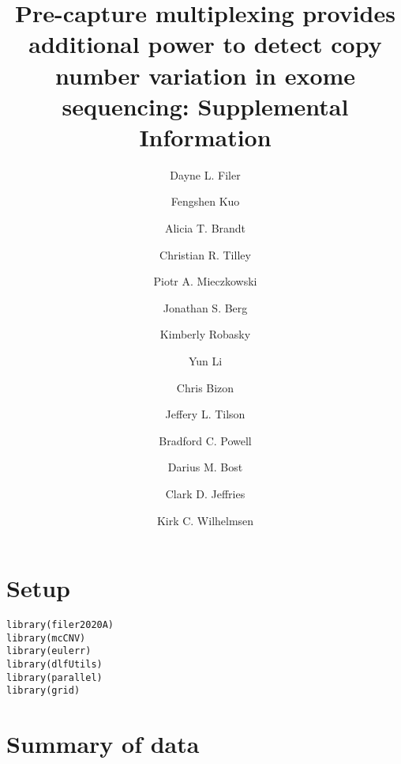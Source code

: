 \documentclass{article}\usepackage[]{graphicx}\usepackage[]{color}
\makeatletter
\newcommand{\hlstd}[1]{\textcolor[rgb]{0.196,0.196,0.196}{#1}}%
\newcommand{\hlkwd}[1]{\textcolor[rgb]{0.78,0.227,0.412}{#1}}%
\newenvironment{kframe}{%
 \def\at@end@of@kframe{}%
 \ifinner\ifhmode%
  \def\at@end@of@kframe{\end{minipage}}%
  \begin{minipage}{\columnwidth}%
 \fi\fi%
 \def\FrameCommand##1{\hskip\@totalleftmargin \hskip-\fboxsep
 \colorbox{shadecolor}{##1}\hskip-\fboxsep
     \hskip-\linewidth \hskip-\@totalleftmargin \hskip\columnwidth}%
 \MakeFramed {\advance\hsize-\width
   \@totalleftmargin\z@ \linewidth\hsize
   \@setminipage}}%
 {\par\unskip\endMakeFramed%
 \at@end@of@kframe}
\newenvironment{knitrout}{}{} %
\makeatother
\begin{document}
\title{Pre-capture multiplexing provides additional power to detect copy number variation in exome sequencing: Supplemental Information}
\author[1,2]{Dayne L. Filer}
\author[1]{Fengshen Kuo}
\author[1]{Alicia T. Brandt}
\author[1]{Christian R. Tilley}
\author[1]{Piotr A. Mieczkowski}
\author[1]{Jonathan S. Berg}
\author[1,2,3]{Kimberly Robasky}
\author[1,4]{Yun Li}
\author[2]{Chris Bizon}
\author[2]{Jeffery L. Tilson}
\author[1,2]{Bradford C. Powell}
\author[1,2]{Darius M. Bost}
\author[2]{Clark D. Jeffries}
\author[1,2,5]{Kirk C. Wilhelmsen}

\date{}

\maketitle

\tableofcontents

\newpage
\section{Setup}

\begin{knitrout}
\color{fgcolor}\begin{kframe}
\begin{alltt}
\hlkwd{library}\hlstd{(filer2020A)}
\hlkwd{library}\hlstd{(mcCNV)}
\hlkwd{library}\hlstd{(eulerr)}
\hlkwd{library}\hlstd{(dlfUtils)}
\hlkwd{library}\hlstd{(parallel)}
\hlkwd{library}\hlstd{(grid)}
\end{alltt}
\end{kframe}
\end{knitrout}

\section{Summary of data}
\end{document}
